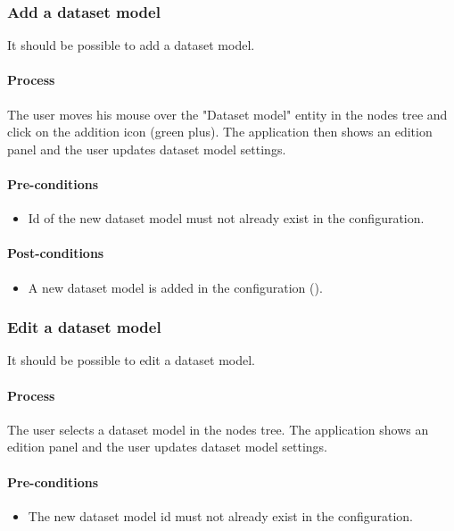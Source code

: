 \documentclass[11pt,a4paper,oneside]{article}
\begin{document}
\subsubsection{Add a dataset model}
It should be possible to add a dataset model.

\paragraph{Process}
The user moves his mouse over the "Dataset model" entity in the nodes tree and click on the addition icon (green plus). The application then shows an edition panel and the user updates dataset model settings.

\paragraph{Pre-conditions}
\begin{itemize}
	\item Id of the new dataset model must not already exist in the configuration.
\end{itemize}

\paragraph{Post-conditions}
\begin{itemize}
	\item A new dataset model is added in the configuration ().
\end{itemize}

\subsubsection{Edit a dataset model}
It should be possible to edit a dataset model.

\paragraph{Process}
The user selects a dataset model in the nodes tree. The application shows an edition panel and the user updates dataset model settings.

\paragraph{Pre-conditions}
\begin{itemize}
	\item The new dataset model id must not already exist in the configuration.
\end{itemize}
\end{document}

